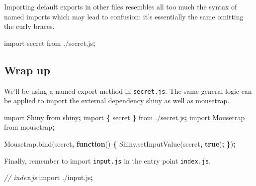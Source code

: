 \documentclass[
  10pt,
]{krantz}
\makeatletter
\newenvironment{Shaded}{\begin{snugshade}}{\end{snugshade}}
\newcommand{\AttributeTok}[1]{\textcolor[rgb]{0.61,0.61,0.61}{#1}}
\newcommand{\CommentTok}[1]{\textcolor[rgb]{0.37,0.37,0.37}{\textit{#1}}}
\newcommand{\ImportTok}[1]{#1}
\newcommand{\KeywordTok}[1]{\textcolor[rgb]{0.27,0.27,0.27}{\textbf{#1}}}
\newcommand{\NormalTok}[1]{#1}
\newcommand{\OperatorTok}[1]{\textcolor[rgb]{0.43,0.43,0.43}{\textbf{#1}}}
\newcommand{\StringTok}[1]{\textcolor[rgb]{0.5,0.5,0.5}{#1}}
\newcommand{\VariableTok}[1]{\textcolor[rgb]{0,0,0}{#1}}
\newenvironment{kframe}{%
\medskip{}
\setlength{\fboxsep}{.8em}
 \def\at@end@of@kframe{}%
 \ifinner\ifhmode%
  \def\at@end@of@kframe{\end{minipage}}%
  \begin{minipage}{\columnwidth}%
 \fi\fi%
 \def\FrameCommand##1{\hskip\@totalleftmargin \hskip-\fboxsep
 \colorbox{shadecolor}{##1}\hskip-\fboxsep
     \hskip-\linewidth \hskip-\@totalleftmargin \hskip\columnwidth}%
 \MakeFramed {\advance\hsize-\width
   \@totalleftmargin\z@ \linewidth\hsize
   \@setminipage}}%
 {\par\unskip\endMakeFramed%
 \at@end@of@kframe}
\renewenvironment{Shaded}{\begin{kframe}}{\end{kframe}}
\makeatother
\begin{document}
Importing default exports in other files resembles all too much the syntax of named imports which may lead to confusion: it's essentially the same omitting the curly braces.

\begin{Shaded}
\begin{Highlighting}[]
\ImportTok{import}\NormalTok{ secret }\ImportTok{from} \StringTok{\textquotesingle{}./secret.js\textquotesingle{}}\OperatorTok{;}
\end{Highlighting}
\end{Shaded}

\hypertarget{webpack-intro-import-export-wrap-up}{%
\subsection{Wrap up}\label{webpack-intro-import-export-wrap-up}}

We'll be using a named export method in \texttt{secret.js}. The same general logic can be applied to import the external dependency shiny as well as mousetrap.

\begin{Shaded}
\begin{Highlighting}[]
\ImportTok{import}\NormalTok{ Shiny }\ImportTok{from} \StringTok{\textquotesingle{}shiny\textquotesingle{}}\OperatorTok{;}
\ImportTok{import} \OperatorTok{\{}\NormalTok{ secret }\OperatorTok{\}} \ImportTok{from} \StringTok{\textquotesingle{}./secret.js\textquotesingle{}}\OperatorTok{;}
\ImportTok{import}\NormalTok{ Mousetrap }\ImportTok{from} \StringTok{\textquotesingle{}mousetrap\textquotesingle{}}\OperatorTok{;}

\VariableTok{Mousetrap}\NormalTok{.}\AttributeTok{bind}\NormalTok{(secret}\OperatorTok{,} \KeywordTok{function}\NormalTok{() }\OperatorTok{\{} 
  \VariableTok{Shiny}\NormalTok{.}\AttributeTok{setInputValue}\NormalTok{(}\StringTok{\textquotesingle{}secret\textquotesingle{}}\OperatorTok{,} \KeywordTok{true}\NormalTok{)}\OperatorTok{;}
\OperatorTok{\}}\NormalTok{)}\OperatorTok{;}
\end{Highlighting}
\end{Shaded}

Finally, remember to import \texttt{input.js} in the entry point \texttt{index.js}.

\begin{Shaded}
\begin{Highlighting}[]
\CommentTok{// index.js}
\ImportTok{import} \StringTok{\textquotesingle{}./input.js\textquotesingle{}}\OperatorTok{;}
\end{Highlighting}
\end{Shaded}
\end{document}
